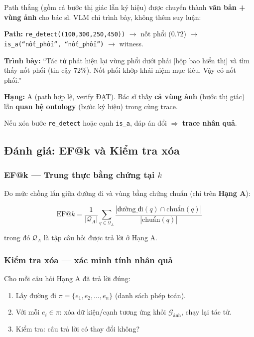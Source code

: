 \documentclass[11pt,a4paper]{article}
\begin{document}
Path thắng (gồm cả bước thị giác lẫn ký hiệu) được chuyển thành \textbf{văn bản + vùng ảnh} cho bác sĩ. VLM chỉ trình bày, không thêm suy luận:

\begin{examplebox}[colback=kronlight, colframe=kronaccent]
\small
\textbf{Path:} \texttt{re\_detect((100,300,250,450))} $\to$ nốt phổi (0.72) $\to$ \texttt{is\_a(``nốt\_phổi'', ``nốt\_phổi'')} $\to$ witness.

\medskip
\textbf{Trình bày:} ``Tác tử phát hiện lại vùng phổi dưới phải [hộp bao hiển thị] và tìm thấy nốt phổi (tin cậy 72\%). Nốt phổi khớp khái niệm mục tiêu. Vậy có nốt phổi.''

\medskip
\textbf{Hạng:} A (path hợp lệ, verify ĐẠT). Bác sĩ thấy \textbf{cả vùng ảnh} (bước thị giác) lẫn \textbf{quan hệ ontology} (bước ký hiệu) trong cùng trace.
\end{examplebox}

Nếu xóa bước \texttt{re\_detect} hoặc cạnh \texttt{is\_a}, đáp án đổi $\Rightarrow$ \textbf{trace nhân quả}.


\subsection{Đánh giá: EF@k và Kiểm tra xóa}

\subsubsection{EF@k --- Trung thực bằng chứng tại $k$}
Đo mức chồng lấn giữa đường đi và vùng bằng chứng chuẩn (chỉ trên \textbf{Hạng A}):

\begin{equation}
\text{EF@}k = \frac{1}{|\mathcal{Q}_A|} \sum_{q \in \mathcal{Q}_A} \frac{|\text{đường\_đi}(q) \cap \text{chuẩn}(q)|}{|\text{chuẩn}(q)|}
\end{equation}

trong đó $\mathcal{Q}_A$ là tập câu hỏi được trả lời ở Hạng A.

\subsubsection{Kiểm tra xóa --- xác minh tính nhân quả}
Cho mỗi câu hỏi Hạng A đã trả lời đúng:
\begin{enumerate}[leftmargin=1.5em]
  \item Lấy đường đi $\pi = \{e_1, e_2, \ldots, e_n\}$ (danh sách phép toán).
  \item Với mỗi $e_i \in \pi$: xóa dữ kiện/cạnh tương ứng khỏi $\mathcal{G}_\text{ảnh}$, chạy lại tác tử.
  \item Kiểm tra: câu trả lời có thay đổi không?
\end{enumerate}
\end{document}
